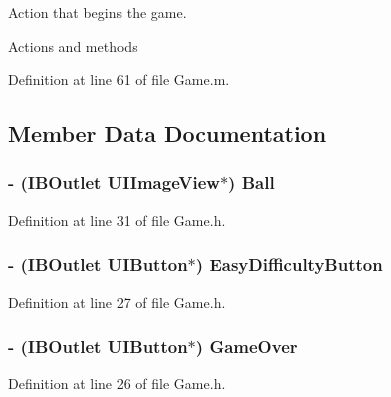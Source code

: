 Action that begins the game. 

Actions and methods 

Definition at line 61 of file Game.\+m.



\subsection{Member Data Documentation}
\hypertarget{interface_game_a282a10964839757856349b7a4eabbb34}{}
\subsubsection[{Ball}]{\setlength{\rightskip}{0pt plus 5cm}-\/ (I\+B\+Outlet U\+I\+Image\+View$\ast$) Ball\hspace{0.3cm}{\ttfamily [protected]}}\label{interface_game_a282a10964839757856349b7a4eabbb34}


Definition at line 31 of file Game.\+h.

\hypertarget{interface_game_a26ba198ea2f0a414b0b95360d1400d36}{}
\subsubsection[{Easy\+Difficulty\+Button}]{\setlength{\rightskip}{0pt plus 5cm}-\/ (I\+B\+Outlet U\+I\+Button$\ast$) Easy\+Difficulty\+Button\hspace{0.3cm}{\ttfamily [protected]}}\label{interface_game_a26ba198ea2f0a414b0b95360d1400d36}


Definition at line 27 of file Game.\+h.

\hypertarget{interface_game_a78210082a1410aee42773e4fb591be43}{}
\subsubsection[{Game\+Over}]{\setlength{\rightskip}{0pt plus 5cm}-\/ (I\+B\+Outlet U\+I\+Button$\ast$) Game\+Over\hspace{0.3cm}{\ttfamily [protected]}}\label{interface_game_a78210082a1410aee42773e4fb591be43}


Definition at line 26 of file Game.\+h.

\hypertarget{interface_game_add112e180082fe43d77188c8ce3d5218}{}
